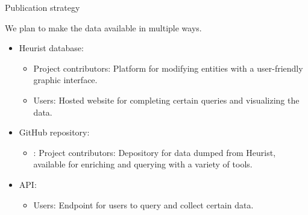 \begin{frame}{Publication strategy}

    We plan to make the data available in multiple ways.

    \vspace{1em}
    
    \begin{itemize}
        \item Heurist database:
        \begin{itemize}
            \item Project contributors: Platform for modifying entities with a user-friendly graphic interface.
            \item Users: Hosted website for completing certain queries and visualizing the data.
        \end{itemize}
        \item GitHub repository:
        \begin{itemize}
            \item: Project contributors: Depository for data dumped from Heurist, available for enriching and querying with a variety of tools.
        \end{itemize}
        \item API:
        \begin{itemize}
            \item Users: Endpoint for users to query and collect certain data.
        \end{itemize}
    \end{itemize}

\end{frame}